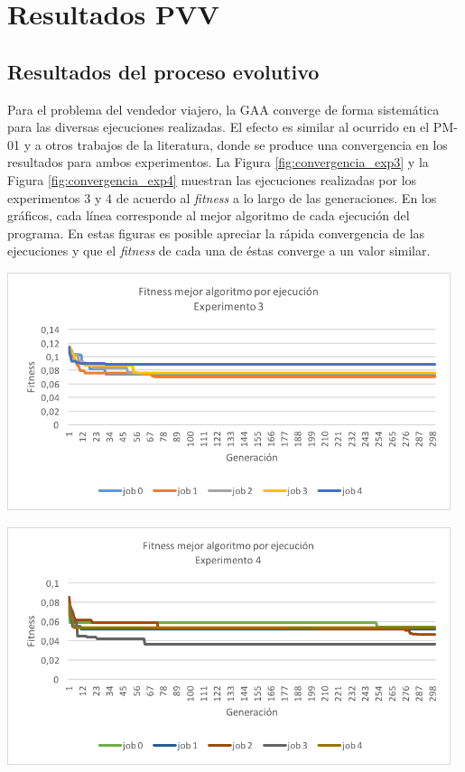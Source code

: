 \section{Resultados PVV}

\subsection{Resultados del proceso evolutivo}

Para el problema del vendedor viajero, la GAA converge de forma sistemática para las diversas ejecuciones realizadas. El efecto es similar al ocurrido en el PM-01 y a otros trabajos de la literatura, donde se produce una convergencia en los resultados para ambos experimentos. La Figura \ref{fig:convergencia_exp3} y la Figura \ref{fig:convergencia_exp4} muestran las ejecuciones realizadas por los experimentos 3 y 4 de acuerdo al \textit{fitness} a lo largo de las generaciones. En los gráficos, cada línea corresponde al mejor algoritmo de cada ejecución del programa. En estas figuras es posible apreciar la rápida convergencia de las ejecuciones y que el \textit{fitness} de cada una de éstas converge a un valor similar.

\begingroup
    \centering
    \includegraphics[width=13cm]{images/cap6/convergencia_exp3.png}
    \label{fig:convergencia_exp3}
\endgroup

\begingroup
    \centering
    \includegraphics[width=13cm]{images/cap6/convergencia_exp4.png}
    \label{fig:convergencia_exp4}
\endgroup

